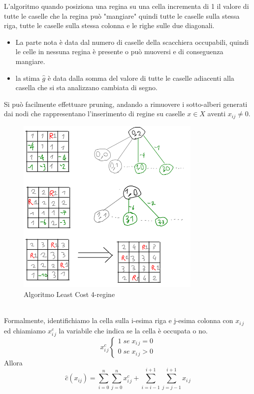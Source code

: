\documentclass[a4paper]{article}
\begin{document}
L'algoritmo quando posiziona una regina su una cella incrementa di 1 il valore di tutte le caselle che la regina può "mangiare" quindi tutte le caselle sulla stessa riga, tutte le caselle sulla stessa colonna e le righe sulle due diagonali.
\begin{itemize}
	\item La parte nota è data dal numero di caselle della scacchiera occupabili, quindi le celle in nessuna regina è presente o può muoversi e di conseguenza mangiare.
	\item la stima $\hat g$ è data dalla somma del valore di tutte le caselle adiacenti alla casella che si sta analizzano cambiata di segno.
\end{itemize}
Si può facilmente effettuare pruning, andando a rimuovere i sotto-alberi generati dai nodi che rappresentano l'inserimento di regine su caselle $x \in X$ aventi $x_{ij} \neq 0$.\\
\begin{figure}[!ht]
\centering
\includegraphics[width=0.8\textwidth]{./img/C7.png}
\caption{Algoritmo Least Cost 4-regine} \label{FIG:C7}
\end{figure}\\

Formalmente, identifichiamo la cella sulla i-esima riga e j-esima colonna con $x_{i\,j}$ ed chiamiamo $x_{i\,j}^c$ la variabile che indica se la cella è occupata o no.
\begin{equation*}
	x_{i\,j}^c\begin{cases}
		1 \; se \; x_{i\,j} = 0\\
		0 \; se \; x_{i\,j} > 0
	\end{cases}
\end{equation*}
Allora
$$ \hat c(x_{ij})= \sum^n_{i=0} \sum^n_{j=0} x_{i\,j}^c + \sum_{i=i-1}^{i+1} \sum_{j=j-1}^{i+1} x_{i\,j}$$  
\end{document}
